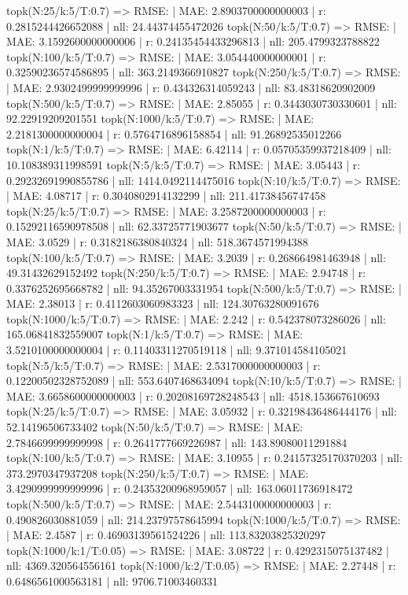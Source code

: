 topk(N:25/k:5/T:0.7) => RMSE: | MAE: 2.8903700000000003 | r: 0.2815244426652088 | nll: 24.44374455472026
topk(N:50/k:5/T:0.7) => RMSE: | MAE: 3.1592600000000006 | r: 0.24135454433296813 | nll: 205.4799323788822
topk(N:100/k:5/T:0.7) => RMSE: | MAE: 3.054440000000001 | r: 0.32590236574586895 | nll: 363.2149366910827
topk(N:250/k:5/T:0.7) => RMSE: | MAE: 2.9302499999999996 | r: 0.434326314059243 | nll: 83.48318620902009
topk(N:500/k:5/T:0.7) => RMSE: | MAE: 2.85055 | r: 0.3443030730330601 | nll: 92.22919209201551
topk(N:1000/k:5/T:0.7) => RMSE: | MAE: 2.2181300000000004 | r: 0.5764716896158854 | nll: 91.26892535012266
topk(N:1/k:5/T:0.7) => RMSE: | MAE: 6.42114 | r: 0.05705359937218409 | nll: 10.108389311998591
topk(N:5/k:5/T:0.7) => RMSE: | MAE: 3.05443 | r: 0.29232691990855786 | nll: 1414.0492114475016
topk(N:10/k:5/T:0.7) => RMSE: | MAE: 4.08717 | r: 0.3040802914132299 | nll: 211.41738456747458
topk(N:25/k:5/T:0.7) => RMSE: | MAE: 3.2587200000000003 | r: 0.15292116590978508 | nll: 62.33725771903677
topk(N:50/k:5/T:0.7) => RMSE: | MAE: 3.0529 | r: 0.3182186380840324 | nll: 518.3674571994388
topk(N:100/k:5/T:0.7) => RMSE: | MAE: 3.2039 | r: 0.268664981463948 | nll: 49.31432629152492
topk(N:250/k:5/T:0.7) => RMSE: | MAE: 2.94748 | r: 0.3376252695668782 | nll: 94.35267003331954
topk(N:500/k:5/T:0.7) => RMSE: | MAE: 2.38013 | r: 0.4112603060983323 | nll: 124.30763280091676
topk(N:1000/k:5/T:0.7) => RMSE: | MAE: 2.242 | r: 0.542378073286026 | nll: 165.06841832559007
topk(N:1/k:5/T:0.7) => RMSE: | MAE: 3.5210100000000004 | r: 0.11403311270519118 | nll: 9.371014584105021
topk(N:5/k:5/T:0.7) => RMSE: | MAE: 2.5317000000000003 | r: 0.12200502328752089 | nll: 553.6407468634094
topk(N:10/k:5/T:0.7) => RMSE: | MAE: 3.6658600000000003 | r: 0.20208169728248543 | nll: 4518.153667610693
topk(N:25/k:5/T:0.7) => RMSE: | MAE: 3.05932 | r: 0.32198436486444176 | nll: 52.14196506733402
topk(N:50/k:5/T:0.7) => RMSE: | MAE: 2.7846699999999998 | r: 0.2641777669226987 | nll: 143.89080011291884
topk(N:100/k:5/T:0.7) => RMSE: | MAE: 3.10955 | r: 0.24157325170370203 | nll: 373.2970347937208
topk(N:250/k:5/T:0.7) => RMSE: | MAE: 3.4290999999999996 | r: 0.24353200968959057 | nll: 163.06011736918472
topk(N:500/k:5/T:0.7) => RMSE: | MAE: 2.5443100000000003 | r: 0.490826030881059 | nll: 214.23797578645994
topk(N:1000/k:5/T:0.7) => RMSE: | MAE: 2.4587 | r: 0.46903139561524226 | nll: 113.83203825320297
topk(N:1000/k:1/T:0.05) => RMSE: | MAE: 3.08722 | r: 0.4292315075137482 | nll: 4369.320564556161
topk(N:1000/k:2/T:0.05) => RMSE: | MAE: 2.27448 | r: 0.6486561000563181 | nll: 9706.71003460331

